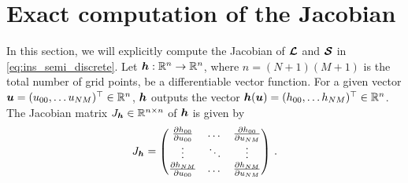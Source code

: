\section{Exact computation of the Jacobian}\label{sec:jacobian}
In this section, we will explicitly compute the Jacobian of $\bm{\mathcal{L}}$ and $\bm{\mathcal{S}}$ in \eqref{eq:ins_semi_discrete}. Let $\bm{h} :\mathbb{R}^{n} \to \mathbb{R}^{n}$, where $n = (N+1)(M+1)$ is the total number of grid points, be a differentiable vector function. For a given vector $\bm{u} = (u_{00}, \dots u_{NM})^\top \in \mathbb{R}^{n}$, $\bm{h}$ outputs the vector $\bm{h}(\bm{u}) = (h_{00}, \dots h_{NM})^\top \in \mathbb{R}^{n}$. The Jacobian matrix $J_{\bm{h}} \in \mathbb{R}^{n\times n}$ of $\bm{h}$ is given by
\[
  J_{\bm{h}} =  
  \begin{pmatrix}
     \frac{\partial h_{00}}{\partial u_{00}} & \dots & 
     \frac{\partial h_{00}}{\partial u_{NM}} 
     \\
     \vdots  &\ddots & \vdots
     \\
     \frac{\partial h_{NM}}{\partial u_{00}} & \dots 
     & \frac{\partial h_{NM}}{\partial u_{NM}} 
  \end{pmatrix}
  \, .
\]

